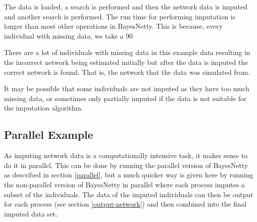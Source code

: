 \documentclass[a4paper,12pt]{article}
\begin{document}
The data is loaded, a search is performed and then the network data is imputed and another search is performed. The run time for performing imputation is longer than most other operations in BayesNetty. This is because, every individual with missing data, we take a 90%

There are a lot of individuals with missing data in this example data resulting in the incorrect network being estimated initially but after the data is imputed the correct network is found. That is, the network that the data was simulated from. 

It may be possible that some individuals are not imputed as they have too much missing data, or sometimes only partially imputed if the data is not suitable for the imputation algorithm. 


\subsection{Parallel Example}
\label{impute-parallel-example}

As imputing network data is a computationally intensive task, it makes sense to do it in parallel. This can be done by running the parallel version of BayesNetty as described in  section \ref{parallel}, but a much quicker way is given here by running the non-parallel version of BayesNetty in parallel where each process imputes a subset of the individuals. The data of the imputed individuals can then be output for each process (see  section \ref{output-network}) and then combined into the final imputed data set. 
\end{document}
